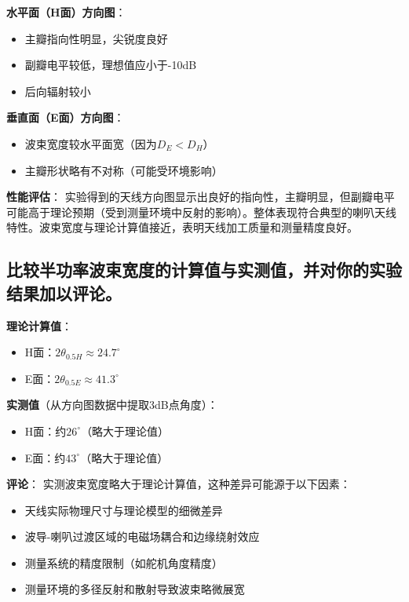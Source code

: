 \documentclass[12pt,a4paper,UTF8]{article}
\begin{document}
\textbf{水平面（H面）方向图}：
\begin{itemize}
    \item 主瓣指向性明显，尖锐度良好
    \item 副瓣电平较低，理想值应小于-10dB
    \item 后向辐射较小
\end{itemize}

\textbf{垂直面（E面）方向图}：
\begin{itemize}
    \item 波束宽度较水平面宽（因为$D_E < D_H$）
    \item 主瓣形状略有不对称（可能受环境影响）
\end{itemize}

\textbf{性能评估}：
实验得到的天线方向图显示出良好的指向性，主瓣明显，但副瓣电平可能高于理论预期（受到测量环境中反射的影响）。整体表现符合典型的喇叭天线特性。波束宽度与理论计算值接近，表明天线加工质量和测量精度良好。

\subsection{比较半功率波束宽度的计算值与实测值，并对你的实验结果加以评论。}

\textbf{理论计算值}：
\begin{itemize}
    \item H面：$2\theta_{0.5H} \approx 24.7^\circ$
    \item E面：$2\theta_{0.5E} \approx 41.3^\circ$
\end{itemize}

\textbf{实测值}（从方向图数据中提取3dB点角度）：
\begin{itemize}
    \item H面：约$26^\circ$（略大于理论值）
    \item E面：约$43^\circ$（略大于理论值）
\end{itemize}

\textbf{评论}：
实测波束宽度略大于理论计算值，这种差异可能源于以下因素：
\begin{itemize}
    \item 天线实际物理尺寸与理论模型的细微差异
    \item 波导-喇叭过渡区域的电磁场耦合和边缘绕射效应
    \item 测量系统的精度限制（如舵机角度精度）
    \item 测量环境的多径反射和散射导致波束略微展宽
\end{itemize}
\end{document}
